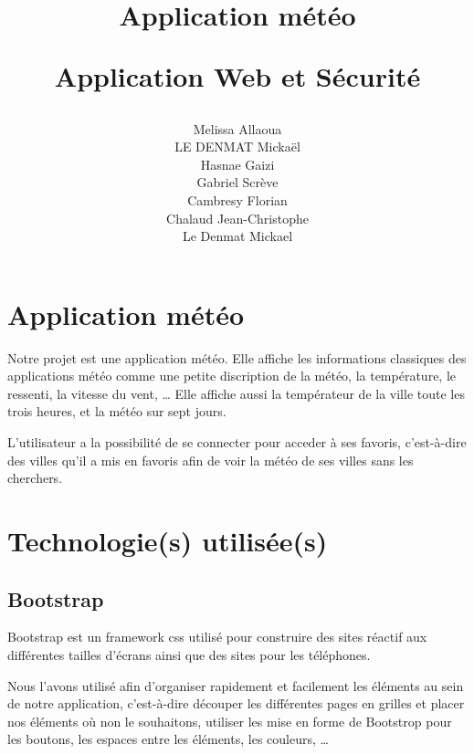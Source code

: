 \documentclass[a4paper, 12pt, french]{article}
\title{
	\Huge
	\textbf{Application météo}
	\vspace{0.4cm}

	\LARGE
	Application Web et Sécurité
}
\author{
	Melissa Allaoua \\
        LE DENMAT Mickaël \\
        Hasnae Gaizi \\
        Gabriel Scrève \\Cambresy Florian \\
	Chalaud Jean-Christophe \\
	Le Denmat Mickael
}
\begin{document}
	

	\newpage
	\renewcommand{\contentsname}{Table des matières}
	\tableofcontents

	\newpage
	\section{Application météo}
		Notre projet est une application météo. Elle affiche les
		informations classiques des applications météo comme
		une petite discription de la météo, la température,
		le ressenti, la vitesse du vent, \ldots
		Elle affiche aussi la températeur de la ville toute les trois heures,
		et la météo sur sept jours.
		

		L'utilisateur a la possibilité de se connecter pour acceder à ses
		favoris, c'est-à-dire des villes qu'il a mis en favoris afin de
		voir la météo de ses villes sans les cherchers.

	\section{Technologie(s) utilisée(s)}
		\subsection{Bootstrap}
			Bootstrap est un framework css \cite*{Bootstrap} utilisé pour construire des sites
			réactif aux différentes tailles d'écrans ainsi que des sites pour les
			téléphones.

			Nous l'avons utilisé afin d'organiser rapidement et facilement
			les éléments au sein de notre application, c'est-à-dire découper 
			les différentes pages en grilles et placer nos éléments où non le
			souhaitons, utiliser les mise en forme de Bootstrop pour les boutons,
			les espaces entre les éléments, les couleurs, \ldots
\end{document}
